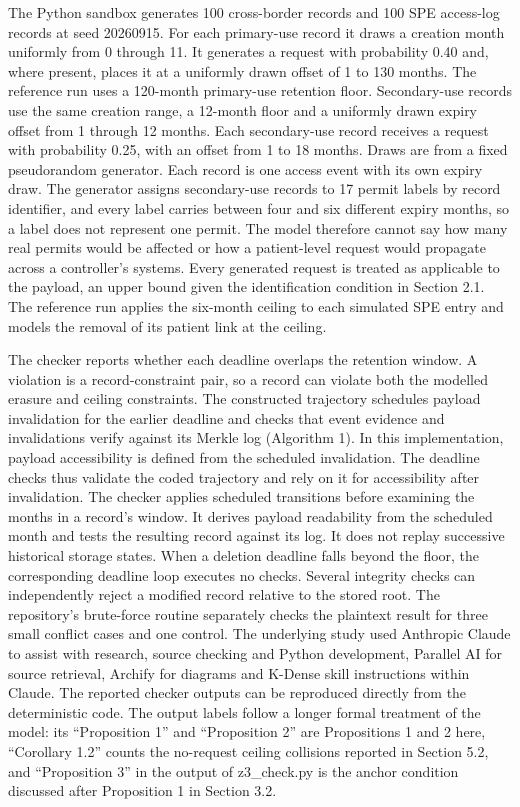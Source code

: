 \documentclass[preprint,review,12pt]{elsarticle}
\begin{document}
The Python sandbox generates 100 cross-border records and 100 SPE
access-log records at seed 20260915. For each primary-use record it
draws a creation month uniformly from 0 through 11. It generates a
request with probability 0.40 and, where present, places it at a
uniformly drawn offset of 1 to 130 months. The reference run uses a
120-month primary-use retention floor. Secondary-use records use the
same creation range, a 12-month floor and a uniformly drawn expiry
offset from 1 through 12 months. Each secondary-use record receives a
request with probability 0.25, with an offset from 1 to 18 months. Draws
are from a fixed pseudorandom generator. Each record is one access event
with its own expiry draw. The generator assigns secondary-use records to
17 permit labels by record identifier, and every label carries between
four and six different expiry months, so a label does not represent one
permit. The model therefore cannot say how many real permits would be
affected or how a patient-level request would propagate across a
controller's systems. Every generated request is treated as applicable
to the payload, an upper bound given the identification condition in
Section 2.1. The reference run applies the six-month ceiling to each
simulated SPE entry and models the removal of its patient link at the
ceiling.

The checker reports whether each deadline overlaps the retention window.
A violation is a record-constraint pair, so a record can violate both
the modelled erasure and ceiling constraints. The constructed trajectory
schedules payload invalidation for the earlier deadline and checks that
event evidence and invalidations verify against its Merkle log
(Algorithm 1). In this implementation, payload accessibility is defined
from the scheduled invalidation. The deadline checks thus validate the
coded trajectory and rely on it for accessibility after invalidation.
The checker applies scheduled transitions before examining the months in
a record's window. It derives payload readability from the scheduled
month and tests the resulting record against its log. It does not replay
successive historical storage states. When a deletion deadline falls
beyond the floor, the corresponding deadline loop executes no checks.
Several integrity checks can independently reject a modified record
relative to the stored root. The repository's brute-force routine
separately checks the plaintext result for three small conflict cases
and one control. The underlying study used Anthropic Claude to assist
with research, source checking and Python development, Parallel AI for
source retrieval, Archify for diagrams and K-Dense skill instructions
within Claude. The reported checker outputs can be reproduced directly
from the deterministic code. The output labels follow a longer formal
treatment of the model: its ``Proposition 1'' and ``Proposition 2'' are
Propositions 1 and 2 here, ``Corollary 1.2'' counts the no-request
ceiling collisions reported in Section 5.2, and ``Proposition 3'' in the
output of z3\_check.py is the anchor condition discussed after
Proposition 1 in Section 3.2.
\end{document}
